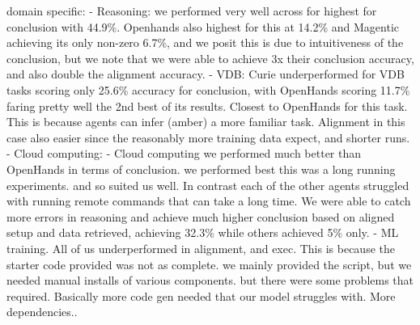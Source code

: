 domain specific: 
- Reasoning: we performed very well across for highest for conclusion with 44.9\%. Openhands also highest for this at 14.2\% and Magentic achieving its only non-zero 6.7\%, and we posit this is due to intuitiveness of the conclusion, but we note that we were able to achieve 3x their conclusion accuracy, and also double the alignment accuracy. 
- VDB: Curie underperformed for VDB tasks scoring only 25.6\% accuracy for conclusion, with OpenHands scoring 11.7\% faring pretty well the 2nd best of its results. Closest to OpenHands for this task. This is because agents can infer (amber) a more familiar task. 
Alignment in this case also easier since the reasonably more training data expect, and shorter runs. 
- Cloud computing: - Cloud computing we performed much better than OpenHands in terms of conclusion. we performed best this was a long running experiments. and so suited us well. In contrast each of the other agents struggled with running remote commands that can take a long time. We were able to catch more errors in reasoning and achieve much higher conclusion based on aligned setup and data retrieved, achieving 32.3\% while others achieved 5\% only. 
- ML training. All of us underperformed in alignment, and exec. This is because the starter code provided was not as complete. we mainly provided the script, but we needed manual installs of various components. but there were some problems that required. Basically more code gen needed that our model struggles with. More dependencies.. 

\fi

